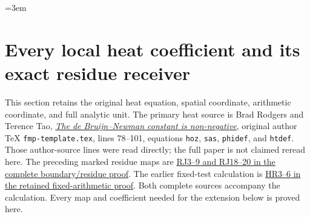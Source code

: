 \begingroup
\emergencystretch=3em
\section{Every local heat coefficient and its exact residue receiver}
\label{sec:all-order-local-residue}

This section retains the original heat equation, spatial coordinate,
arithmetic coordinate, and full analytic unit. The primary heat source
is Brad Rodgers and Terence Tao,
\href{https://arxiv.org/abs/1801.05914v5}{\emph{The de Bruijn--Newman
constant is non-negative}}, original author TeX
\texttt{fmp-template.tex}, lines 78--101, equations \texttt{hoz},
\texttt{sas}, \texttt{phidef}, and \texttt{htdef}. Those author-source
lines were read directly; the full paper is not claimed reread here.
The preceding marked residue maps are
\href{https://github.com/KokunoYumeto/zeta-function-research-reader/blob/87e386271c488ce5914b9926c4d23d0857e0c367/workbenches/splitzero-tandem/continuations/20260923-boundary-residue-arithmetic/BOUNDARY_RESIDUE_ARITHMETIC_RECEIVERS.tex}
{RJ3--9 and RJ18--20 in the complete boundary/residue proof}.
The earlier fixed-test calculation is
\href{https://github.com/KokunoYumeto/zeta-function-research-reader/blob/87e386271c488ce5914b9926c4d23d0857e0c367/workbenches/splitzero-tandem/continuations/20260923-boundary-residue-arithmetic/RETAINED_FIXED_ARITHMETIC_HEAT_FLAGS.tex}
{HR3--6 in the retained fixed-arithmetic proof}.
Both complete sources accompany the calculation. Every map and coefficient
needed for the extension below is proved here.

